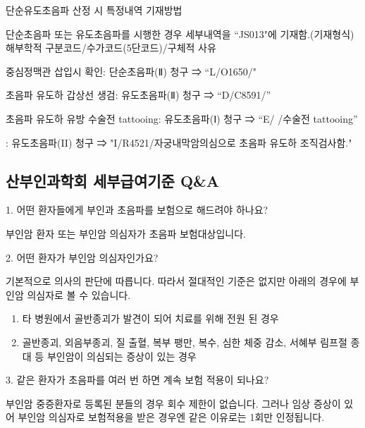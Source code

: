 \textsf{단순\bullet 유도초음파 산정 시 특정내역 기재방법}
\begin{commentbox}{}
단순초음파 또는 유도초음파를 시행한 경우 세부내역을 “JS013"에 기재함.(기재형식) 해부학적 구분코드/수가코드(5단코드)/구체적 사유
	\begin{description}\tightlist
	\item[(예시1)] 중심정맥관 삽입시 확인: 단순초음파(Ⅱ) 청구 ⇒ “L/O1650/"
	\item[(예시2)] 초음파 유도하 갑상선 생검: 유도초음파(Ⅱ) 청구 ⇒ “D/C8591/”
	\item[(예시3)] 초음파 유도하 유방 수술전 tattooing: 유도초음파(Ⅰ) 청구 ⇒ “E/ /수술전 tattooing”
	\item[(예시4)]  : 유도초음파(II) 청구 ⇒ "I/R4521/자궁내막암의심으로 초음파 유도하 조직검사함."
	\end{description} 
\end{commentbox}
\prezi{\clearpage}
\subsection{산부인과학회 세부급여기준 Q\&A}
1. 어떤 환자들에게 부인과 초음파를 보험으로 해드려야 하나요?
\begin{quotebox}
부인암 환자 또는 부인암 의심자가 초음파 보험대상입니다.
\end{quotebox}
2. 어떤 환자가 부인암 의심자인가요?
\begin{quotebox}
기본적으로 의사의 판단에 따릅니다. 따라서 절대적인 기준은 없지만 아래의 경우에 부인암 의심자로 볼 수 있습니다.\par
	\begin{enumerate}[1)]\tightlist
	\item 타 병원에서 골반종괴가 발견이 되어 치료를 위해 전원 된 경우
	\item 골반종괴, 외음부종괴, 질 출혈, 복부 팽만, 복수, 심한 체중 감소, 서혜부 림프절 종대 등 부인암이 의심되는 증상이 있는 경우
	\end{enumerate}
\end{quotebox}
3. 같은 환자가 초음파를 여러 번 하면 계속 보험 적용이 되나요?
\begin{quotebox}
부인암 중증환자로 등록된 분들의 경우 회수 제한이 없습니다. 그러나 임상 증상이 있어 부인암 의심자로 보험적용을 받은 경우엔 같은 이유로는 1회만 인정됩니다.
\end{quotebox}